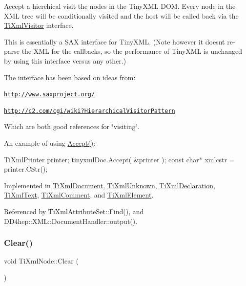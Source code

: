 Accept a hierchical visit the nodes in the Tiny\+X\+ML D\+OM. Every node in the X\+ML tree will be conditionally visited and the host will be called back via the \hyperlink{class_ti_xml_visitor}{Ti\+Xml\+Visitor} interface.

This is essentially a S\+AX interface for Tiny\+X\+ML. (Note however it doesn\textquotesingle{}t re-\/parse the X\+ML for the callbacks, so the performance of Tiny\+X\+ML is unchanged by using this interface versus any other.)

The interface has been based on ideas from\+:


\begin{DoxyItemize}
\item \href{http://www.saxproject.org/}{\tt http\+://www.\+saxproject.\+org/}
\item \href{http://c2.com/cgi/wiki?HierarchicalVisitorPattern}{\tt http\+://c2.\+com/cgi/wiki?\+Hierarchical\+Visitor\+Pattern}
\end{DoxyItemize}

Which are both good references for \char`\"{}visiting\char`\"{}.

An example of using \hyperlink{class_ti_xml_node_acc0f88b7462c6cb73809d410a4f5bb86}{Accept()}\+: \begin{DoxyVerb}TiXmlPrinter printer;
tinyxmlDoc.Accept( &printer );
const char* xmlcstr = printer.CStr();
\end{DoxyVerb}
 

Implemented in \hyperlink{class_ti_xml_document_a8ddd6eec722cbd25900bbac664909bac}{Ti\+Xml\+Document}, \hyperlink{class_ti_xml_unknown_aafdf1b2d4f561979c7907bad91004999}{Ti\+Xml\+Unknown}, \hyperlink{class_ti_xml_declaration_aa1b6bade6c989407ce9881bdfc73c1e6}{Ti\+Xml\+Declaration}, \hyperlink{class_ti_xml_text_af65964326eac4640bfb97d4622fa0de2}{Ti\+Xml\+Text}, \hyperlink{class_ti_xml_comment_ac894241530d1d266131a5026cb251a95}{Ti\+Xml\+Comment}, and \hyperlink{class_ti_xml_element_a01d33358cce9d1817b557d314dda3779}{Ti\+Xml\+Element}.



Referenced by Ti\+Xml\+Attribute\+Set\+::\+Find(), and D\+D4hep\+::\+X\+M\+L\+::\+Document\+Handler\+::output().

\hypertarget{class_ti_xml_node_a708e7f953df61d4d2d12f73171550a4b}{}\label{class_ti_xml_node_a708e7f953df61d4d2d12f73171550a4b} 
\subsubsection{\texorpdfstring{Clear()}{Clear()}}
{\footnotesize\ttfamily void Ti\+Xml\+Node\+::\+Clear (\begin{DoxyParamCaption}{ }\end{DoxyParamCaption})}



